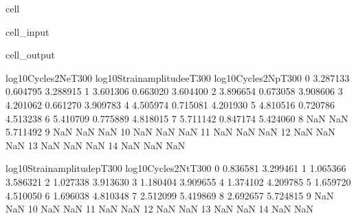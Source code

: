 \documentclass[letterpaper,10pt,english]{jupyterBook}
\begin{document}
\begin{sphinxuseclass}{cell}
\begin{sphinxVerbatimInput}
\begin{sphinxuseclass}{cell_input}
		\end{sphinxuseclass}\end{sphinxVerbatimInput}
		\begin{sphinxVerbatimOutput}
			
			\begin{sphinxuseclass}{cell_output}
				\begin{sphinxVerbatim}[commandchars=\\\{\}]
					log10Cycles2N\PYGZus{}eT300  log10Strainamplitude\PYGZus{}eT300  log10Cycles2N\PYGZus{}pT300  \PYGZbs{}
					0              3.287133                   \PYGZhy{}0.604795             3.288915   
					1              3.601306                   \PYGZhy{}0.663020             3.604400   
					2              3.896654                   \PYGZhy{}0.673058             3.908606   
					3              4.201062                   \PYGZhy{}0.661270             3.909783   
					4              4.505974                   \PYGZhy{}0.715081             4.201930   
					5              4.810516                   \PYGZhy{}0.720786             4.513238   
					6              5.410709                   \PYGZhy{}0.775889             4.818015   
					7              5.711142                   \PYGZhy{}0.847174             5.424060   
					8                   NaN                         NaN             5.711492   
					9                   NaN                         NaN                  NaN   
					10                  NaN                         NaN                  NaN   
					11                  NaN                         NaN                  NaN   
					12                  NaN                         NaN                  NaN   
					13                  NaN                         NaN                  NaN   
					14                  NaN                         NaN                  NaN   
					
					log10Strainamplitude\PYGZus{}pT300  log10Cycles2N\PYGZus{}tT300  \PYGZbs{}
					0                    \PYGZhy{}0.836581             3.299461   
					1                    \PYGZhy{}1.065366             3.586321   
					2                    \PYGZhy{}1.027338             3.913630   
					3                    \PYGZhy{}1.180404             3.909655   
					4                    \PYGZhy{}1.374102             4.209785   
					5                    \PYGZhy{}1.659720             4.510050   
					6                    \PYGZhy{}1.696038             4.810348   
					7                    \PYGZhy{}2.512099             5.419869   
					8                    \PYGZhy{}2.692657             5.724815   
					9                          NaN                  NaN   
					10                         NaN                  NaN   
					11                         NaN                  NaN   
					12                         NaN                  NaN   
					13                         NaN                  NaN   
					14                         NaN                  NaN   
					

\end{sphinxVerbatim}
\end{sphinxuseclass}
\end{sphinxVerbatimOutput}
\end{sphinxuseclass}
\end{document}
